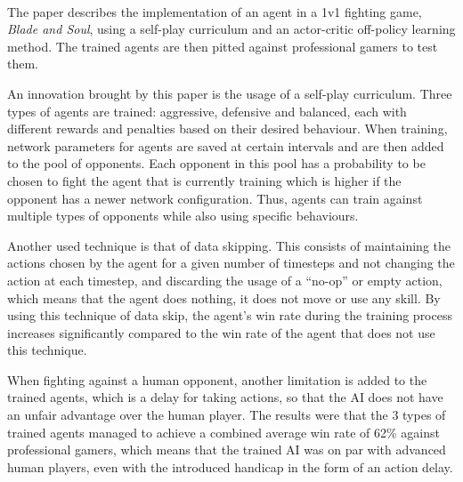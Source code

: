 \paragraph{}
The paper \cite{oh2020creatingprolevelaiforfightinggame} describes the implementation of an agent in a 1v1 fighting game, \emph{Blade and Soul}, using a self-play curriculum and an actor-critic off-policy learning method. The trained agents are then pitted against professional gamers to test them.

An innovation brought by this paper is the usage of a self-play curriculum. Three types of agents are trained: aggressive, defensive and balanced, each with different rewards and penalties based on their desired behaviour. When training, network parameters for agents are saved at certain intervals and are then added to the pool of opponents. Each opponent in this pool has a probability to be chosen to fight the agent that is currently training which is higher if the opponent has a newer network configuration. Thus, agents can train against multiple types of opponents while also using specific behaviours.

Another used technique is that of data skipping. This consists of maintaining the actions chosen by the agent for a given number of timesteps and not changing the action at each timestep, and discarding the usage of a \enquote{no-op} or empty action, which means that the agent does nothing, it does not move or use any skill. By using this technique of data skip, the agent's win rate during the training process increases significantly compared to the win rate of the agent that does not use this technique.

When fighting against a human opponent, another limitation is added to the trained agents, which is a delay for taking actions, so that the AI does not have an unfair advantage over the human player. The results were that the 3 types of trained agents managed to achieve a combined average win rate of 62\% against professional gamers, which means that the trained AI was on par with advanced human players, even with the introduced handicap in the form of an action delay.



